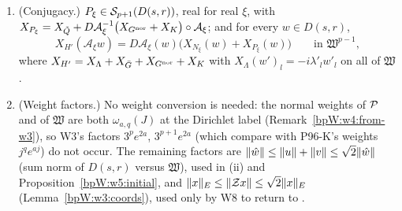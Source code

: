 \begin{lemma}
\begin{enumerate}[label=(\roman*)]
  \[H'\circ\mathcal A_\xi=e(\xi)+N_\xi+P_\xi,\qquad e(\xi)=\langle\lambda_J,\xi\rangle+\tfrac12\langle A\xi,\xi\rangle,\qquad
  N_\xi=\langle\omega^0(\xi),y\rangle+\sum_{j\ge1}\Omega^0_{j+2}(\xi)z_j\bar z_j,\]
  with $\omega^0,\Omega^0$ of Definition~\ref{bpW:w7:omega0} ($\omega^0=\lambda_J+A\xi$,
  $\Omega^0_J=\lambda_J+\frac{3}{2\pi\lambda_J}\langle b,\xi\rangle$), and
  $P_\xi=\tilde Q+G^{\rm nor}\circ\mathcal A_\xi+K\circ\mathcal A_\xi$, $\tilde Q=\frac12\langle Ay,y\rangle+
  \sum_{j\ge1}\frac{3\langle b,y\rangle}{2\pi\lambda_{j+2}}z_j\bar z_j$.
\item (Conjugacy.) $P_\xi\in\mathcal S_{p+1}(D(s,r))$, real for real $\xi$, with $X_{P_\xi}=X_{\tilde Q}+D\mathcal A_\xi^{-1}\bigl(X_{G^{\rm nor}}+X_K\bigr)\circ\mathcal A_\xi$; and for every
  $w\in D(s,r)$,
  \[X_{H'}(\mathcal A_\xi w)=D\mathcal A_\xi(w)\bigl(X_{N_\xi}(w)+X_{P_\xi}(w)\bigr)\qquad\text{in }\mathfrak W^{p-1},\]
  where $X_{H'}=X_\Lambda+X_{\bar G}+X_{G^{\rm nor}}+X_K$ with $X_\Lambda(w')_l=-i\lambda'_lw'_l$ on all of $\mathfrak W$.
\item (Weight factors.) No weight conversion is needed: the normal weights of $\mathcal P$ and of $\mathfrak W$ are both
  $\omega_{a,q}(J)$ at the Dirichlet label (Remark~\ref{bpW:w4:from-w3}), so W3's factors $3^pe^{2a}$, $3^{p+1}e^{2a}$
  (which compare with P96-K's weights $j^qe^{aj}$) do not occur. The remaining factors are
  $\lVert \hat w\rVert\le\lVert u\rVert+\lVert v\rVert\le\sqrt2\lVert \hat w\rVert$ (sum norm of $D(s,r)$ versus $\mathfrak W$), used in (ii) and
  Proposition~\ref{bpW:w5:initial}, and $\lVert x\rVert_E\le\lVert \mathcal Zx\rVert\le\sqrt2\lVert x\rVert_E$ (Lemma~\ref{bpW:w3:coords}),
  used only by W8 to return to .
\end{enumerate}
\end{lemma}
